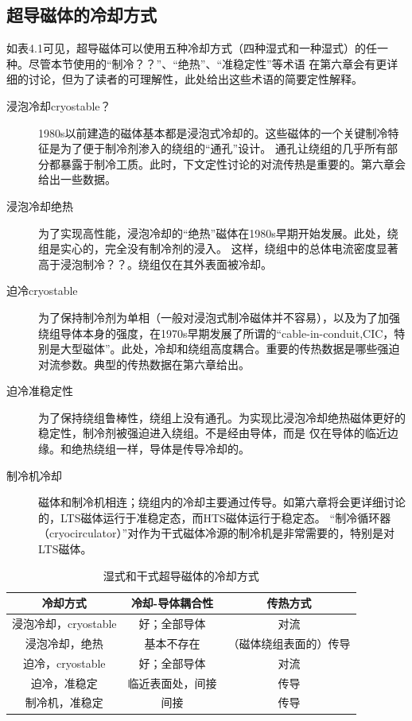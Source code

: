 \subsection*{超导磁体的冷却方式}
如表4.1可见，超导磁体可以使用五种冷却方式（四种湿式和一种湿式）的任一种。尽管本节使用的“制冷？？”、“绝热”、“准稳定性”等术语
在第六章会有更详细的讨论，但为了读者的可理解性，此处给出这些术语的简要定性解释。
\begin{description}
  \item[浸泡冷却cryostable？] 1980s以前建造的磁体基本都是浸泡式冷却的。这些磁体的一个关键制冷特征是为了便于制冷剂渗入的绕组的“通孔”设计。
  通孔让绕组的几乎所有部分都暴露于制冷工质。此时，下文定性讨论的对流传热是重要的。第六章会给出一些数据。
  \item[浸泡冷却绝热] 为了实现高性能，浸泡冷却的“绝热”磁体在1980s早期开始发展。此处，绕组是实心的，完全没有制冷剂的浸入。
  这样，绕组中的总体电流密度显著高于浸泡制冷？？。绕组仅在其外表面被冷却。
  \item[迫冷cryostable] 为了保持制冷剂为单相（一般对浸泡式制冷磁体并不容易），以及为了加强绕组导体本身的强度，在1970s早期发展了所谓的“cable-in-conduit,CIC，特别是大型磁体”。此处，冷却和绕组高度耦合。重要的传热数据是哪些强迫对流参数。典型的传热数据在第六章给出。
  \item[迫冷准稳定性] 为了保持绕组鲁棒性，绕组上没有通孔。为实现比浸泡冷却绝热磁体更好的稳定性，制冷剂被强迫进入绕组。不是经由导体，而是
  仅在导体的临近边缘。和绝热绕组一样，导体是传导冷却的。
  \item[制冷机冷却] 磁体和制冷机相连；绕组内的冷却主要通过传导。如第六章将会更详细讨论的，LTS磁体运行于准稳定态，而HTS磁体运行于稳定态。
  “制冷循环器（cryocirculator）”对作为干式磁体冷源的制冷机是非常需要的，特别是对LTS磁体。
\end{description}
\begin{table}[htbp]\small
  \centering
  \caption{湿式和干式超导磁体的冷却方式} \label{coolingmethod}
\begin{tabular}{|c|c|c|}
  \hline
\textbf{冷却方式}&\textbf{冷却-导体耦合性}&\textbf{传热方式} \\ \hline \hline
浸泡冷却，cryostable & 好；全部导体& 对流\\ \hline
浸泡冷却，绝热 & 基本不存在 &（磁体绕组表面的）传导 \\ \hline
迫冷，cryostable &好；全部导体&对流\\ \hline
迫冷，准稳定 &临近表面处，间接&传导\\ \hline\hline
制冷机，准稳定&间接 &传导 \\ \hline
\end{tabular}
\end{table}

